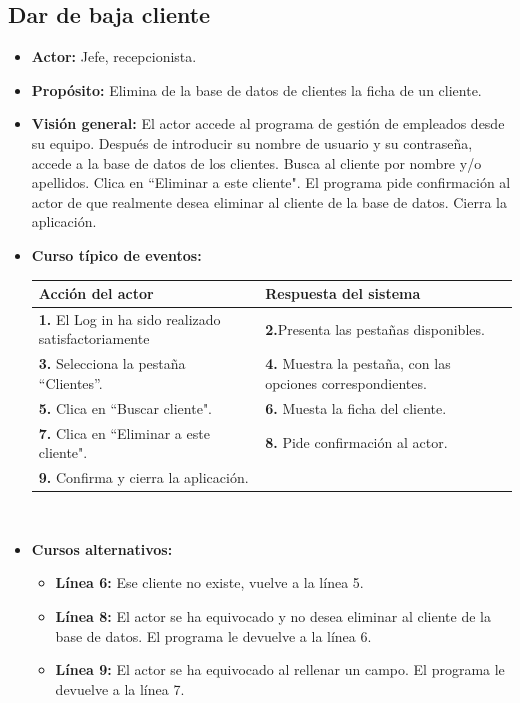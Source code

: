 \documentclass[spanish,a4paper,11pt, twoside]{report}	%
\begin{document}
	\subsection{Dar de baja cliente} 
			\begin{itemize}
			\item \textbf{Actor:} Jefe, recepcionista.
			\item \textbf{Propósito:} Elimina de la base de datos de clientes la ficha de un cliente.
			\item \textbf{Visión general:} El actor accede al programa de gestión de empleados desde su equipo. Después de introducir su nombre de usuario y su contraseña, accede a la base de datos de los clientes.  Busca al cliente por nombre y/o apellidos. Clica en “Eliminar a este cliente". El programa pide confirmación al actor de que realmente desea eliminar al cliente de la base de datos. Cierra la aplicación. 
			\item \textbf{Curso típico de eventos:} 	\\
				\begin{tabular}{|p{6cm}||p{6cm}|}
				\hline
				\textbf{Acción del actor} & \textbf{Respuesta del sistema} \\ \hline \hline
				\textbf{1.} El Log in ha sido realizado satisfactoriamente & \textbf{2.}Presenta las pestañas disponibles.\\ \hline 
				\textbf{3.} Selecciona la pestaña “Clientes”. & \textbf{4.} Muestra la pestaña, con las opciones correspondientes. \\ \hline
				\textbf{5.} Clica en “Buscar cliente".	& \textbf{6.} Muesta la ficha del cliente. \\ \hline
				\textbf{7.} Clica en “Eliminar a este cliente". & \textbf{8.} Pide confirmación al actor.\\ \hline
				\textbf{9.} Confirma y cierra la aplicación. & \textbf{} \\ \hline
			\end{tabular}
			\\
			\item \textbf{Cursos alternativos:} 
			\begin{itemize}
			\item  \textbf{Línea 6:} Ese cliente no existe, vuelve a la línea 5.
			\item  \textbf{Línea 8:} El actor se ha equivocado y no desea eliminar al cliente de la base de datos. El programa le devuelve a la línea 6.
			\item  \textbf{Línea 9:} El actor se ha equivocado al rellenar un campo. El programa le devuelve a la línea 7.
			\end {itemize}
		\end{itemize}
\end{document}
